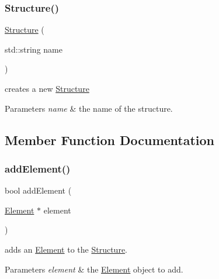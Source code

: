 \subsubsection{\texorpdfstring{Structure()}{Structure()}}
{\footnotesize\ttfamily \mbox{\hyperlink{class_a_g_d_s_1_1_structure}{Structure}} (\begin{DoxyParamCaption}\item[{std\+::string}]{name }\end{DoxyParamCaption})}



creates a new \mbox{\hyperlink{class_a_g_d_s_1_1_structure}{Structure}} 


\begin{DoxyParams}{Parameters}
{\em name} & the name of the structure. \\
\hline
\end{DoxyParams}


\subsection{Member Function Documentation}
\mbox{\label{class_a_g_d_s_1_1_structure_a2dd203e6770f7d15d6f706867c919a60}} 
\subsubsection{\texorpdfstring{add\+Element()}{addElement()}}
{\footnotesize\ttfamily bool add\+Element (\begin{DoxyParamCaption}\item[{\mbox{\hyperlink{class_a_g_d_s_1_1_element}{Element}} $\ast$}]{element }\end{DoxyParamCaption})}



adds an \mbox{\hyperlink{class_a_g_d_s_1_1_element}{Element}} to the \mbox{\hyperlink{class_a_g_d_s_1_1_structure}{Structure}}. 


\begin{DoxyParams}{Parameters}
{\em element} & the \mbox{\hyperlink{class_a_g_d_s_1_1_element}{Element}} object to add. \\
\hline
\end{DoxyParams}
